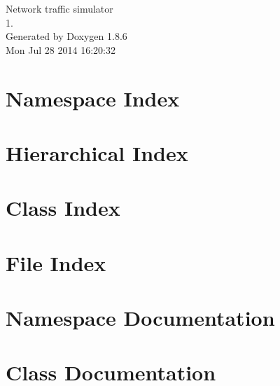 \documentclass[twoside]{book}
\newcommand{\clearemptydoublepage}{%
  \newpage{\pagestyle{empty}\cleardoublepage}%
}
\begin{document}
\hypersetup{pageanchor=false}
\begin{titlepage}
\vspace*{7cm}
\begin{center}%
{\Large Network traffic simulator \\[1ex]\large 1. }\\
\vspace*{1cm}
{\large Generated by Doxygen 1.8.6}\\
\vspace*{0.5cm}
{\small Mon Jul 28 2014 16:20:32}\\
\end{center}
\end{titlepage}
\clearemptydoublepage
\tableofcontents
\clearemptydoublepage
{}
\hypersetup{pageanchor=true}

\chapter{Namespace Index}

\chapter{Hierarchical Index}

\chapter{Class Index}

\chapter{File Index}

\chapter{Namespace Documentation}



\chapter{Class Documentation}






















\end{document}
